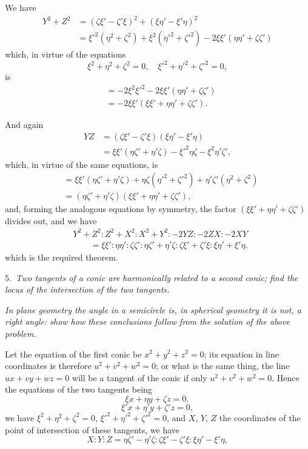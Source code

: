 \documentclass[11pt,a4paper]{article}
\theoremstyle{plain}
\theoremstyle{definition}
\begin{document}
We have
\begin{align*}
Y^2 + Z^2 &= (\zeta\xi' - \zeta'\xi)^2 + (\xi\eta' - \xi'\eta)^2 \\
          &= \xi'^2(\eta^2+\zeta^2) + \xi^2(\eta'^2+\zeta'^2)
             -2\xi\xi'(\eta\eta'+\zeta\zeta')
\end{align*}
which, in virtue of the equations
\[
\xi^2 + \eta^2 + \zeta^2 = 0, \quad \xi'^2 + \eta'^2 + \zeta'^2 = 0,
\]
is
\begin{align*}
&= -2\xi^2\xi'^2 -2\xi\xi'(\eta\eta' + \zeta\zeta')\\
&= -2\xi\xi'(\xi\xi' + \eta\eta' + \zeta\zeta').
\end{align*}

And again
\begin{align*}
YZ &= (\zeta\xi' - \zeta'\xi)(\xi\eta' - \xi'\eta) \\
   &= \xi\xi'(\eta\zeta' + \eta'\zeta) - \xi'^2\eta\zeta - \xi^2\eta'\zeta',
\end{align*}
which, in virtue of the same equations, is
\begin{align*}
&= \xi\xi'(\eta\zeta' + \eta'\zeta)
   + \eta\zeta(\eta'^2+\zeta'^2)+\eta'\zeta'(\eta^2+\zeta^2)\\
&= (\eta\zeta' + \eta'\zeta)(\xi\xi' + \eta\eta' + \zeta\zeta'),
\end{align*}
and, forming the analogous equations by symmetry, the factor $(\xi\xi' + \eta\eta' + \zeta\zeta')$ divides
out, and we have
\begin{align*}
&Y^2+Z^2 : Z^2+X^2 : X^2+Y^2 : -2YZ : -2ZX : -2XY\\
&\qquad= \xi\xi' : \eta\eta' : \zeta\zeta' : \eta\zeta'+\eta'\zeta :
\zeta\xi'+\zeta'\xi : \xi\eta'+\xi'\eta,
\end{align*}
which is the required theorem.

5.\ \textit{Two tangents of a conic are harmonically related to a second conic; find the locus of the intersection of the two tangents.}

\textit{In plane geometry the angle in a semicircle is, in spherical geometry it is not, a right angle: show how these conclusions follow from the solution of the above problem.}

Let the equation of the first conic be $x^2 + y^2 + z^2 = 0$; its equation in line
coordinates is therefore $u^2+v^2+w^2=0$; or what is the same thing, the line
$ux + vy + wz = 0$ will be a tangent of the conic if only $u^2 + v^2 + w^2 = 0$.
Hence the equations of the two tangents being
\[
\xi x + \eta y + \zeta z = 0,
\]
\[
\xi' x + \eta' y + \zeta' z = 0,
\]
we have $\xi^2 + \eta^2 + \zeta^2 = 0$, $\xi'^2 + \eta'^2 + \zeta'^2 = 0$, and $X$, $Y$, $Z$ the coordinates of
the point of intersection of these tangents, we have
\[
X : Y : Z = \eta\zeta' - \eta'\zeta : \zeta\xi' - \zeta'\xi : \xi\eta' - \xi'\eta,
\]
\end{document}
